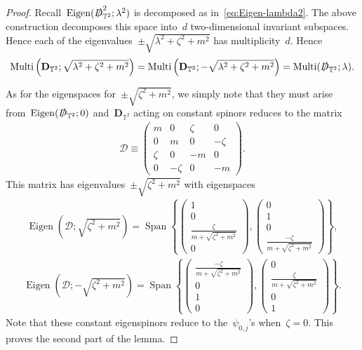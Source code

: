 \documentclass[11pt,final]{amsart}
\newcommand{\T}{\mathbb{T}}
\newcommand{\D}{\slashed{D}}
\newcommand{\pD}{\mathbf{D}}
\newcommand{\parenthesis}[1]{\left(#1\right)} %
\newcommand{\braces}[1]{\left\{#1\right\}} %
\DeclareMathOperator{\Eigen}{Eigen}
\DeclareMathOperator{\Mtp}{Multi} %
\DeclareMathOperator{\Span}{Span}
\begin{document}
\begin{proof}
    Recall~$\Eigen(\D_{\T^2}^2;\lambda^2)$ is decomposed as in~\eqref{eq:Eigen-lambda2}.
    The above construction decomposes this space into~$d$ two-dimensional invariant subspaces. Hence each of the eigenvalues~$\pm\sqrt{\lambda^2+\zeta^2+m^2}$ has multiplicity~$d$.  
    Hence
    \begin{align}
        \Mtp\parenthesis{
            \pD_{\T^2};
            \sqrt{\lambda^2+\zeta^2+m^2}}
        =\Mtp\parenthesis{
            \pD_{\T^2};
            -\sqrt{\lambda^2+\zeta^2+m^2}}
        =\Mtp(\D_{\T^2};\lambda).
    \end{align}

    As for the eigenspaces for~$\pm\sqrt{\zeta^2+m^2}$, we simply note that they must arise from~$\Eigen(\D_{\T^2};0)$ and~$\pD_{\T^2}$ acting on constant spinors reduces to the matrix
    \begin{align}
        \mathscr{D}\equiv
        \begin{pmatrix}
            m & 0 & \zeta & 0 \\
            0 & m & 0& -\zeta \\
            \zeta & 0 & -m & 0 \\
            0 & -\zeta & 0 & -m
        \end{pmatrix}. 
    \end{align}
    This matrix has eigenvalues~$\pm\sqrt{\zeta^2+m^2}$ with eigenspaces 
    \begin{align}
        \Eigen(\mathscr{D};\sqrt{\zeta^2+m^2})
        =\Span\braces{ \begin{pmatrix} 1 \\ 0 \\ \frac{\zeta}{ m+\sqrt{\zeta^2+m^2} } \\ 0  \end{pmatrix}, 
        \begin{pmatrix} 0 \\ 1 \\ 0 \\ \frac{-\zeta}{m+\sqrt{\zeta^2+m^2}} \end{pmatrix} }, 
    \end{align}
    \begin{align}
        \Eigen(\mathscr{D};-\sqrt{\zeta^2+m^2})
        =\Span\braces{ \begin{pmatrix} \frac{-\zeta}{m+\sqrt{\zeta^2+m^2}} \\ 0 \\ 1 \\ 0  \end{pmatrix}, 
        \begin{pmatrix} 0 \\ \frac{\zeta}{m+\sqrt{\zeta^2+m^2}} \\ 0 \\ 1 \end{pmatrix}}. 
    \end{align}
    Note that these constant eigenspinors reduce to the~$\psi_{0,j}$'s when~$\zeta=0$. 
    This proves the second part of the lemma. 
\end{proof}
\end{document}

